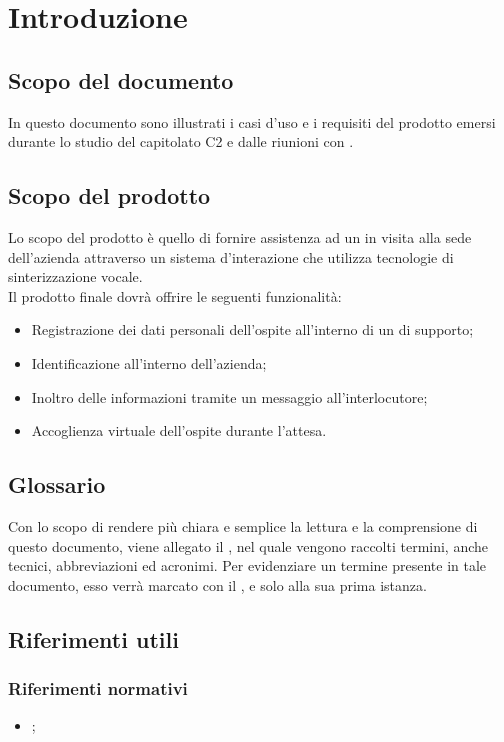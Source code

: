 \documentclass[../AnalisiDeiRquisiti.tex]{subfiles}
\begin{document}
\section{Introduzione}

	\subsection{Scopo del documento}
	In questo documento sono illustrati i casi d'uso e i requisiti del prodotto emersi durante lo studio del capitolato C2 e dalle riunioni con \prop.
	
	\subsection{Scopo del prodotto}
	Lo scopo del prodotto è quello di fornire assistenza ad un  in visita alla sede dell'azienda attraverso un sistema d'interazione che utilizza tecnologie di sinterizzazione vocale.
	\\Il prodotto finale dovrà offrire le seguenti funzionalità:
	\begin{itemize}
		\item Registrazione dei dati personali dell'ospite all'interno di un  di supporto;
		\item Identificazione  all'interno dell'azienda;
		\item Inoltro delle informazioni tramite un messaggio  all'interlocutore;
		\item Accoglienza virtuale dell'ospite durante l'attesa.
	\end{itemize}

	\subsection{Glossario}
	Con lo scopo di rendere più chiara e semplice la lettura e la comprensione di questo documento, viene allegato il \glossariov, nel quale vengono raccolti termini, anche tecnici, abbreviazioni ed acronimi. Per evidenziare un termine presente in tale documento, esso verrà marcato con il , e solo alla sua prima istanza.
	
	\subsection{Riferimenti utili}
		\subsubsection{Riferimenti normativi}
		\begin{itemize}
			\item \textbf{\normediprogettov};
		\end{itemize}
	
\end{document}
